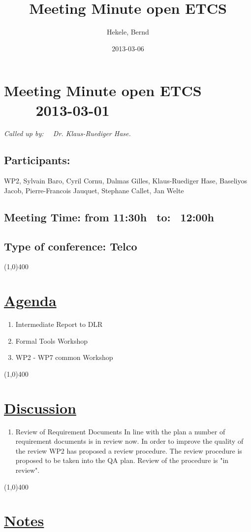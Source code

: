 \documentclass[a4paper]{article}
\title{Meeting Minute open ETCS}
\author{Hekele, Bernd}
\date{2013-03-06}
\begin{document}
\section*{\large{Meeting Minute open ETCS \ \ \ \ 2013-03-01}}

\large{\emph{Called up by: \ \  Dr. Klaus-Ruediger Hase.}}

\subsection*{Participants:} WP2, Sylvain Baro, Cyril Cornu,  Dalmas Gilles, Klaus-Ruediger Hase, Baseliyos Jacob, Pierre-Francois Jauquet, Stephane Callet, Jan Welte\\

\subsection*{Meeting Time: from 11:30h \ to: \ 12:00h}

\subsection*{Type of conference: Telco}

\line(1,0){400}
\section*{\underline{Agenda}}
\begin{enumerate}
\item Intermediate Report to DLR
\item Formal Tools Workshop
\item WP2 - WP7 common Workshop
\end{enumerate}
\line(1,0){400}
\section*{\underline{Discussion}}

\begin{enumerate}

\item Review of Requirement Documents\newline
In line with the plan a number of requirement documents is in review now. In order to improve the quality of the review WP2 has proposed a review procedure. The review procedure is proposed to be taken into the QA plan. Review of the procedure is "in review".

 
\end{enumerate}

\line(1,0){400}
\section*{\underline{Notes}}
\end{document}
